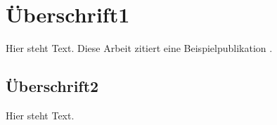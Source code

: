 \section{Überschrift1}
\label{Label1}

Hier steht Text. Diese Arbeit zitiert eine Beispielpublikation \cite{example_reference}.


\subsection{Überschrift2}
\label{Label2}

Hier steht Text.

